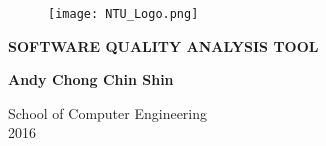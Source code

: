 \thispagestyle{empty}

\begin{center}

\begin{figure}[h]
    \centering
    \texttt{[image: NTU\_Logo.png]}
\end{figure}

\vspace{5.0cm}

\textbf{\Large \MakeUppercase{Software Quality Analysis Tool}}

\vspace{\fill}

\textbf{Andy Chong Chin Shin}

\vspace{3.0cm}

School of Computer Engineering \\
2016

\end{center}
